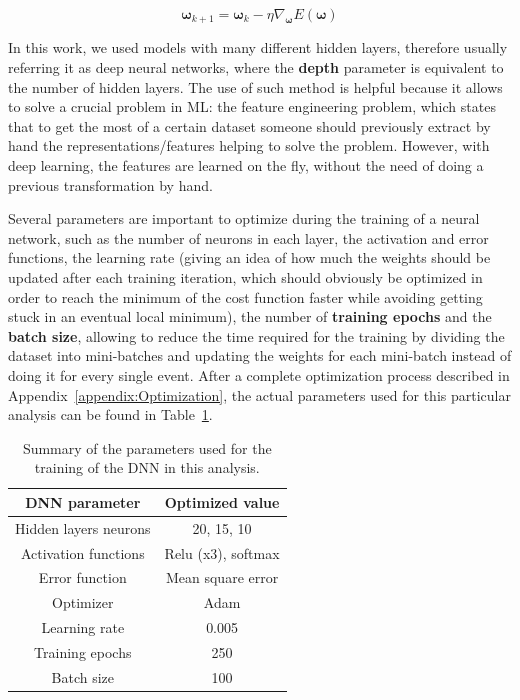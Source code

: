 \documentclass[a4paper, 10pt, openright]{report}
\begin{document}
\begin{equation}
\label{eq:NN3}
\bm \omega_{k+1} = \bm \omega_k - \eta \nabla_{\bm \omega} E(\bm \omega)
\end{equation}

In this work, we used models with many different hidden layers, therefore usually referring it as deep neural networks, where the \textbf{depth} parameter is equivalent to the number of hidden layers. The use of such method is helpful because it allows to solve a crucial problem in \ac{ML}: the feature engineering problem, which states that to get the most of a certain dataset someone should previously extract by hand the representations/features helping to solve the problem. However, with deep learning, the features are learned on the fly, without the need of doing a previous transformation by hand.

Several parameters are important to optimize during the training of a neural network, such as the number of neurons in each layer, the activation and error functions, the learning rate (giving an idea of how much the weights should be updated after each training iteration, which should obviously be optimized in order to reach the minimum of the cost function faster while avoiding getting stuck in an eventual local minimum), the number of \textbf{training epochs} and the \textbf{batch size}, allowing to reduce the time required for the training by dividing the dataset into mini-batches and updating the weights for each mini-batch instead of doing it for every single event. After a complete optimization process described in Appendix~\ref{appendix:Optimization}, the actual parameters used for this particular analysis can be found in Table~\ref{table:DNN}.

\begin{table}
\begin{center}
\begin{tabular}{ c|c } 
\hline
 DNN parameter & Optimized value \\
 \hline
 Hidden layers neurons & 20, 15, 10 \\
 Activation functions & Relu (x3), softmax \\
Error function & Mean square error \\
Optimizer & Adam \\
Learning rate & 0.005 \\
Training epochs & 250 \\
Batch size & 100 \\
\hline
\end{tabular}
\caption{Summary of the parameters used for the training of the \ac{DNN} in this analysis.}
\label{table:DNN}
\end{center}
\end{table}
\end{document}
